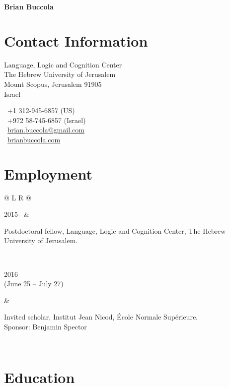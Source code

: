\documentclass[11pt,letterpaper,twoside]{article}
\makeatletter
\newcommand{\datewidth}{0.21}
\newcommand{\bodywidth}{0.76}
\newenvironment{cvsection}{%
  \setlength{\extrarowheight}{0.70ex}
  \begin{longtable}[l]{@{} L R @{}}
}{%
  \end{longtable}
}
\makeatother
\begin{document}
\thispagestyle{first}

\begin{center}
  {\Huge\bfseries Brian Buccola}
\end{center}

\vspace{1em}

\section*{Contact Information}

\begin{minipage}[t]{0.63\textwidth}
  Language, Logic and Cognition Center\\
  The Hebrew University of Jerusalem\\
  Mount Scopus, Jerusalem 91905\\
  Israel
\end{minipage}
\begin{minipage}[t]{0.36\textwidth}
  \Telefon\ +1 312-945-6857 {\footnotesize (US)}\\
  \Telefon\ +972 58-745-6857 {\footnotesize (Israel)}\\
  \Letter\ \href{mailto:brian.buccola@gmail.com}{\ttfamily brian.buccola@gmail.com}\\
  \Keyboard\ \href{http://brianbuccola.com/}{\ttfamily brianbuccola.com}
\end{minipage}

\section*{Employment}

\begin{cvsection}
  2015-- & \parbox[t]{\bodywidth\textwidth}{%
    Postdoctoral fellow, Language, Logic and Cognition Center, The Hebrew
    University of Jerusalem.
  }\\

  \parbox[t]{\datewidth\textwidth}{%
    2016\\
    {\footnotesize (June 25 -- July 27)}
  } & \parbox[t]{\bodywidth\textwidth}{%
    Invited scholar, Institut Jean Nicod, École Normale Supérieure.\\
    {\footnotesize Sponsor: Benjamin Spector}
  }\\
\end{cvsection}

\section*{Education}
\end{document}

